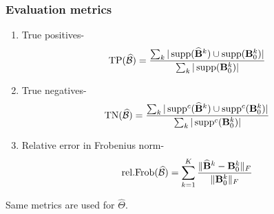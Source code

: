 \documentclass[10pt]{beamer}
\theoremstyle{definition}
\DeclareMathOperator*{\supp}{\text{supp}}
\begin{document}
\begin{frame}
\frametitle{Evaluation metrics}
\begin{enumerate}
\item True positives-
%
\[
\text{TP} (\widehat \cB) = \frac{\sum_k | \supp(\widehat \bfB^k) \cup \supp (\bfB_0^k)|}{\sum_k | \supp (\bfB_0^k)| }
\]
\item True negatives-
%
\[
\text{TN} (\widehat \cB) = \frac{\sum_k | \supp^c(\widehat \bfB^k) \cup \supp^c (\bfB_0^k)|}{\sum_k | \supp^c (\bfB_0^k)| }
\]
%
\item Relative error in Frobenius norm-
%
\[
\text{rel.Frob} (\widehat {{\cal{B}}}) = \sum_{k=1}^K \frac{\| \widehat {{\mathbf{B}}}^k - {\mathbf{B}}_0^k \|_F}{\| {\mathbf{B}}_0^k \|_F}
\]
%
\end{enumerate}

Same metrics are used for $\widehat \Theta$.
\end{frame}
\end{document}
